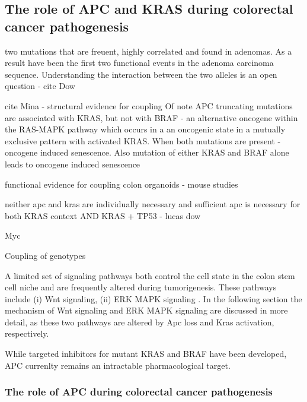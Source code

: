\begin{flushleft}
\subsection{The role of APC and KRAS during colorectal cancer pathogenesis}
two mutations that are freuent, highly correlated and found in adenomas. As a result have been  the first two functional events in the adenoma carcinoma sequence. 
Understanding the interaction between the two alleles is an open question - cite Dow

cite Mina - structural evidence for coupling
Of note APC truncating mutations are associated with KRAS, but not with BRAF - an alternative oncogene within the RAS-MAPK pathway which occurs in a an oncogenic state in a mutually exclusive pattern with activated KRAS. When both mutations are present - oncogene induced senescence. 
Also mutation of either KRAS and BRAF alone leads to oncogene induced senescence

functional evidence for coupling
colon organoids - 
mouse studies 

neither apc and kras are individually necessary and sufficient 
apc is necessary for both KRAS context AND KRAS + TP53 - lucas dow

Myc






Coupling of genotypes

A limited set of signaling pathways both control the cell state in the colon stem cell niche and are frequently altered during tumorigenesis. These pathways include (i) Wnt signaling, (ii) ERK MAPK signaling \citep{gehartTalesCryptNew2019}. In the following section the mechanism of Wnt signaling and ERK MAPK signaling are discussed in more detail, as these two pathways are altered by Apc loss and Kras activation, respectively.


While targeted inhibitors for mutant KRAS and BRAF have been developed, APC currenlty remains an intractable pharmacological target. 

\subsubsection{The role of APC during colorectal cancer pathogenesis}


\end{flushleft}
